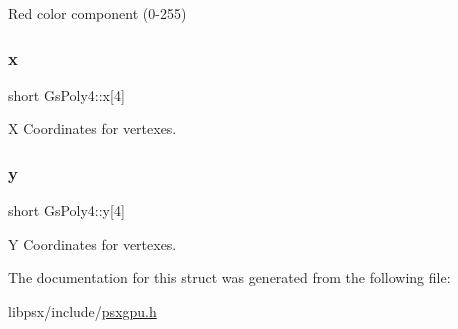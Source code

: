 Red color component (0-\/255) 

\mbox{\label{structGsPoly4_a8fc65921b04745ae353e3c84b5100e0e}} 
\subsubsection{\texorpdfstring{x}{x}}
{\footnotesize\ttfamily short Gs\+Poly4\+::x\mbox{[}4\mbox{]}}



X Coordinates for vertexes. 

\mbox{\label{structGsPoly4_ac3ac9fb14ed1df2858808b4de7981cd4}} 
\subsubsection{\texorpdfstring{y}{y}}
{\footnotesize\ttfamily short Gs\+Poly4\+::y\mbox{[}4\mbox{]}}



Y Coordinates for vertexes. 



The documentation for this struct was generated from the following file\+:\begin{DoxyCompactItemize}
\item 
libpsx/include/\hyperlink{psxgpu_8h}{psxgpu.\+h}\end{DoxyCompactItemize}
